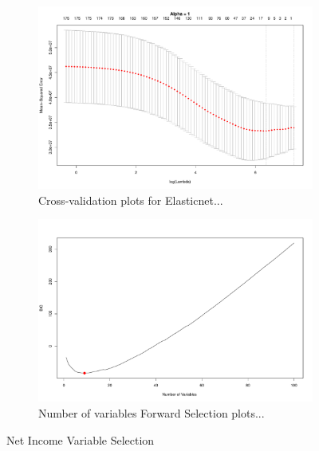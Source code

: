 \documentclass{article}
\begin{document}
\begin{figure}[!tbp]
\begin{subfigure}[b]{0.5\textwidth}
\includegraphics[width=\textwidth]{elastic_cv_netincome.pdf}
\caption{Cross-validation plots for Elasticnet...}
\end{subfigure}
\hfill
\begin{subfigure}[b]{0.5\textwidth}
\includegraphics[width=\textwidth]{forward_nvars_netincome.pdf}
\caption{Number of variables Forward Selection plots...}
\end{subfigure}
\caption{Net Income Variable Selection}
\label{figure:netincome_opt}
\end{figure}
\end{document}
